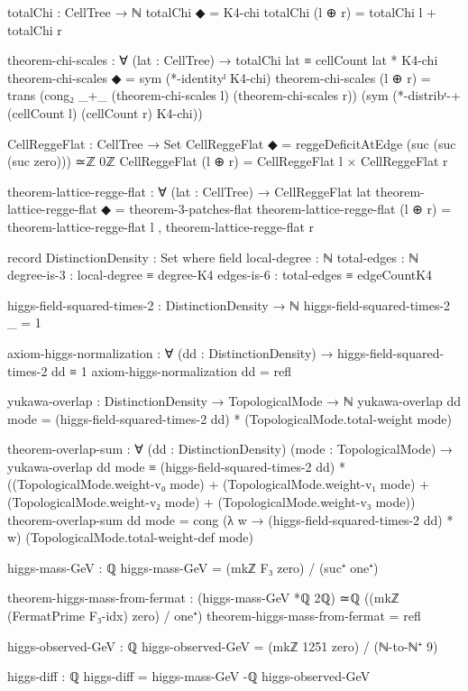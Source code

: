 \documentclass[11pt,a4paper]{book}
\begin{document}
\begin{code}
totalChi : CellTree → ℕ
totalChi ◆       = K4-chi
totalChi (l ⊕ r) = totalChi l + totalChi r

theorem-chi-scales : ∀ (lat : CellTree) →
  totalChi lat ≡ cellCount lat * K4-chi
theorem-chi-scales ◆ = sym (*-identityˡ K4-chi)
theorem-chi-scales (l ⊕ r) =
  trans (cong₂ _+_
               (theorem-chi-scales l)
               (theorem-chi-scales r))
        (sym (*-distribʳ-+ (cellCount l) (cellCount r) K4-chi))

CellReggeFlat : CellTree → Set
CellReggeFlat ◆       = reggeDeficitAtEdge (suc (suc (suc zero))) ≃ℤ 0ℤ
CellReggeFlat (l ⊕ r) = CellReggeFlat l × CellReggeFlat r

theorem-lattice-regge-flat : ∀ (lat : CellTree) → CellReggeFlat lat
theorem-lattice-regge-flat ◆       = theorem-3-patches-flat
theorem-lattice-regge-flat (l ⊕ r) =
  theorem-lattice-regge-flat l , theorem-lattice-regge-flat r

record DistinctionDensity : Set where
  field
    local-degree : ℕ
    total-edges : ℕ
    degree-is-3 : local-degree ≡ degree-K4
    edges-is-6 : total-edges ≡ edgeCountK4

higgs-field-squared-times-2 : DistinctionDensity → ℕ
higgs-field-squared-times-2 _ = 1

axiom-higgs-normalization :
  ∀ (dd : DistinctionDensity) →
  higgs-field-squared-times-2 dd ≡ 1
axiom-higgs-normalization dd = refl

yukawa-overlap : DistinctionDensity → TopologicalMode → ℕ
yukawa-overlap dd mode = 
  (higgs-field-squared-times-2 dd) * (TopologicalMode.total-weight mode)

theorem-overlap-sum :
  ∀ (dd : DistinctionDensity) (mode : TopologicalMode) →
  yukawa-overlap dd mode ≡
    (higgs-field-squared-times-2 dd) *
    ((TopologicalMode.weight-v₀ mode) +
     (TopologicalMode.weight-v₁ mode) +
     (TopologicalMode.weight-v₂ mode) +
     (TopologicalMode.weight-v₃ mode))
theorem-overlap-sum dd mode = 
  cong (λ w → (higgs-field-squared-times-2 dd) * w) (TopologicalMode.total-weight-def mode)

higgs-mass-GeV : ℚ
higgs-mass-GeV = (mkℤ F₃ zero) / (suc⁺ one⁺)

theorem-higgs-mass-from-fermat : (higgs-mass-GeV *ℚ 2ℚ) ≃ℚ ((mkℤ (FermatPrime F₃-idx) zero) / one⁺)
theorem-higgs-mass-from-fermat = refl

higgs-observed-GeV : ℚ
higgs-observed-GeV = (mkℤ 1251 zero) / (ℕ-to-ℕ⁺ 9)

higgs-diff : ℚ
higgs-diff = higgs-mass-GeV -ℚ higgs-observed-GeV


\end{code}
\end{document}
